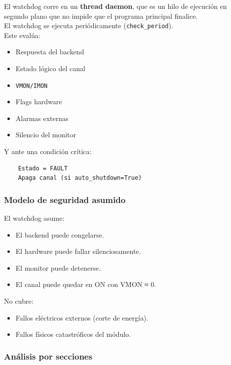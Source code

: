 \documentclass{article}
\begin{document}
El watchdog corre en un \textbf{thread daemon}, que es un hilo de ejecución en segundo plano que no impide que el programa principal finalice.\\

El watchdog se ejecuta periódicamente (\texttt{check\_period}).\\

Este evalúa:
\begin{itemize}
    \item Respuesta del backend
    \item Estado lógico del canal
    \item \texttt{VMON/IMON}
    \item Flags hardware
    \item Alarmas externas
    \item Silencio del monitor
\end{itemize}
Y ante una condición crítica: 
\begin{lstlisting}
    Estado = FAULT
    Apaga canal (si auto_shutdown=True)
\end{lstlisting}

\subsubsection{Modelo de seguridad asumido}

El watchdog asume:

\begin{itemize}
    \item El backend puede congelarse.
    \item El hardware puede fallar silenciosamente.
    \item El monitor puede detenerse.
    \item El canal puede quedar en ON con VMON ≈ 0.
\end{itemize}

No cubre:
\begin{itemize}
    \item Fallos eléctricos externos (corte de energía).
    \item Fallos físicos catastróficos del módulo.
\end{itemize}

\subsubsection{Análisis por secciones}
\end{document}
